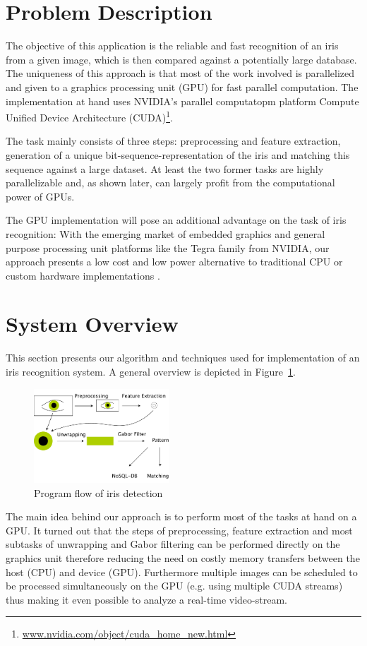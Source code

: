 \documentclass[journal]{IEEEtran}
\begin{document}
\section{Problem Description}
The objective of this application is the reliable and fast recognition of an iris from a given image, which is then compared against a potentially large database. The uniqueness of this approach is that most of the work involved is parallelized and given to a graphics processing unit (GPU) for fast parallel computation. The implementation at hand uses NVIDIA's parallel computatopm platform Compute Unified Device Architecture (CUDA)\footnote{\url{www.nvidia.com/object/cuda_home_new.html}}.
\par The task mainly consists of three steps: preprocessing and feature extraction, generation of a unique bit-sequence-representation of the iris and matching this sequence against a large dataset. At least the two former tasks are highly parallelizable and, as shown later, can largely profit from the computational power of GPUs.
\par The GPU implementation will pose an additional advantage on the task of iris recognition: With the emerging market of embedded graphics and general purpose processing unit platforms like the Tegra family from NVIDIA, our approach presents a low cost and low power alternative to traditional CPU or custom hardware implementations \cite{4483498}.

\section{System Overview}

This section presents our algorithm and techniques used for implementation of an iris recognition system. A general overview is depicted in Figure~\ref{fig:flow}.
\begin{figure}[ht]
	\centering
  \includegraphics[width=0.45\textwidth]{iris/flow}
	\caption{Program flow of iris detection}
	\label{fig:flow}
\end{figure}
The main idea behind our approach is to perform most of the tasks at hand on a GPU. It turned out that the steps of preprocessing, feature extraction and most subtasks of unwrapping and Gabor filtering can be performed directly on the graphics unit therefore reducing the need on costly memory transfers between the host (CPU) and device (GPU). Furthermore multiple images can be scheduled to be processed simultaneously on the GPU (e.g. using multiple CUDA streams) thus making it even possible to analyze a real-time video-stream.
\end{document}
